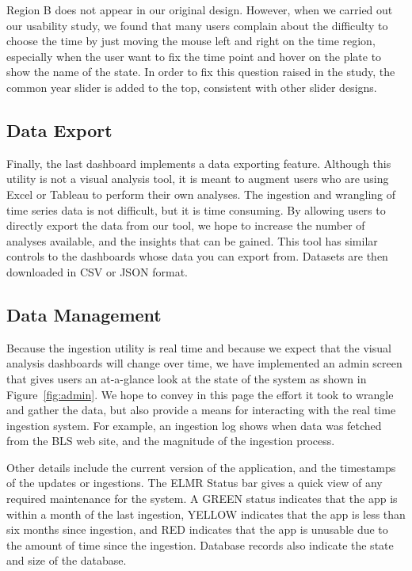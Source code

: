 \documentclass{sigchi}
\begin{document}
Region B does not appear in our original design. However, when we carried out our usability study, we found that many users complain about the difficulty to choose the time by just moving the mouse left and right on the time region, especially when the user want to fix the time point and hover on the plate to show the name of the state. In order to fix this question raised in the study, the common year slider is added to the top, consistent with other slider designs.

\subsection{Data Export}

Finally, the last dashboard implements a data exporting feature. Although this utility is not a visual analysis tool, it is meant to augment users who are using Excel or Tableau to perform their own analyses. The ingestion and wrangling of time series data is not difficult, but it is time consuming. By allowing users to directly export the data from our tool, we hope to increase the number of analyses available, and the insights that can be gained. This tool has similar controls to the dashboards whose data you can export from. Datasets are then downloaded in CSV or JSON format.

\subsection{Data Management}

Because the ingestion utility is real time and because we expect that the visual analysis dashboards will change over time, we have implemented an admin screen that gives users an at-a-glance look at the state of the system as shown in Figure~\ref{fig:admin}. We hope to convey in this page the effort it took to wrangle and gather the data, but also provide a means for interacting with the real time ingestion system. For example, an ingestion log shows when data was fetched from the BLS web site, and the magnitude of the ingestion process.

Other details include the current version of the application, and the timestamps of the updates or ingestions. The ELMR Status bar gives a quick view of any required maintenance for the system. A GREEN status indicates that the app is within a month of the last ingestion, YELLOW indicates that the app is less than six months since ingestion, and RED indicates that the app is unusable due to the amount of time since the ingestion. Database records also indicate the state and size of the database.
\end{document}

